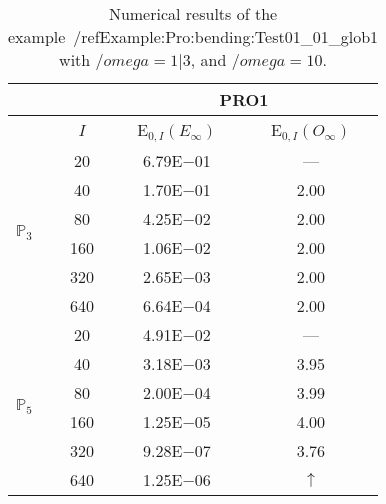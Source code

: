 \begin{table}[H]
\caption{Numerical results of the example~/ref{Example:Pro:bending:Test01_01_glob1} with $/omega=1|3$, and $/omega=10$.}
\setlength{\tabcolsep}{5pt}
\centering
\begin{tabular}{@{}l c c c@{}}
\toprule
 &  & \multicolumn{2}{c}{PRO1}\\
\midrule
 & $I$ & E$_{0,I}(E_{\infty})$ & E$_{0,I}(O_{\infty})$\\
\midrule
\multirow{6}{*}{$\mathbb{P}_{3}$}
 & 20 & 6.79E$-$01 & ---\\
 & 40 & 1.70E$-$01 & 2.00\\
 & 80 & 4.25E$-$02 & 2.00\\
 & 160 & 1.06E$-$02 & 2.00\\
 & 320 & 2.65E$-$03 & 2.00\\
 & 640 & 6.64E$-$04 & 2.00\\
\midrule
\multirow{6}{*}{$\mathbb{P}_{5}$}
 & 20 & 4.91E$-$02 & ---\\
 & 40 & 3.18E$-$03 & 3.95\\
 & 80 & 2.00E$-$04 & 3.99\\
 & 160 & 1.25E$-$05 & 4.00\\
 & 320 & 9.28E$-$07 & 3.76\\
 & 640 & 1.25E$-$06 & $\uparrow$\\
\bottomrule
\end{tabular}
\label{Table:PRO:test_01_01_test30_pro1}
\end{table}
